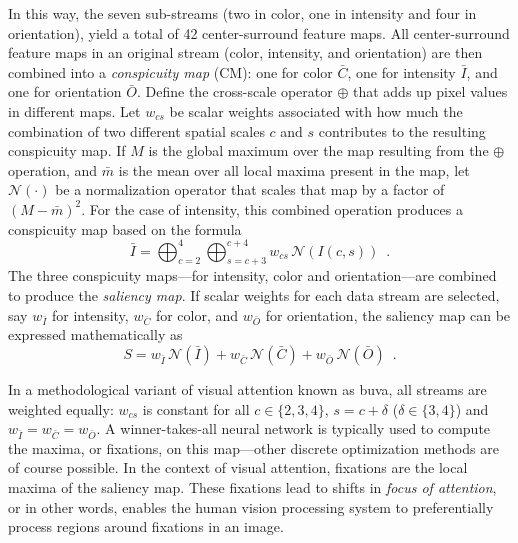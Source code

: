 In this way, the seven sub-streams (two in color, one in intensity and four in orientation), 
yield a total of 42 center-surround feature maps.
All center-surround feature maps in an original stream (color, intensity,
and orientation) are then combined into a \emph{conspicuity map} (CM):
one for color $\bar{C}$, one for intensity $\bar{I}$, and one for orientation $\bar{O}$. 
Define the cross-scale operator $\oplus$ that adds up pixel values in different maps. 
Let $w_{cs}$ be scalar weights associated with how much the combination of
two different spatial scales $c$ and $s$ contributes to the resulting conspicuity map.
If $M$ is the global maximum over the map resulting from the $\oplus$ operation, and $\bar{m}$ is the mean over
all local maxima present in the map, let $\mathcal{N}(\cdot)$ be a normalization operator that scales that map by a factor of $(M-\bar{m})^{2}$.
For the case of intensity, this combined operation produces a conspicuity map based on the formula
%
\begin{equation} \label{eq:feature_map}
 \bar{I}=\bigoplus_{c=2}^{4} \bigoplus_{s=c+3}^{c+4}w_{cs}\,\mathcal{N}(I(c,s))
\enspace.
\end{equation}
%
The three conspicuity maps---for intensity, color and orientation---are combined to produce the \emph{saliency map}.
If scalar weights for each data stream are selected, say
$w_{\bar{I}}$ for intensity, $w_{\bar{C}}$ for color, and 
$w_{\bar{O}}$ for orientation, the saliency map can be expressed mathematically as
%
\begin{equation} \label{eq:saliency_map}
 S=w_{\bar{I}}\,\mathcal{N}(\bar{I})+w_{\bar{C}}\,\mathcal{N}(\bar{C})+
 w_{\bar{O}}\,\mathcal{N}(\bar{O}) \enspace.
\end{equation}
%

In a methodological variant of visual attention known as \gls{buva}, all streams are weighted equally: $w_{cs}$ is constant for all $c\in\{2,3,4\}$,  $s=c+\delta$ ($\delta\in\{3,4\}$)
and $w_{\bar{I}}=w_{\bar{C}}=w_{\bar{O}}$. 
A winner-takes-all neural network is typically used \cite{itti,walther} 
to compute the maxima, or fixations, on this map---other discrete optimization methods are of course possible.
In the context of visual attention, fixations are the local maxima of the saliency map.  
These fixations lead to shifts in \emph{focus of attention}, or in other words, 
enables the human vision processing system to preferentially process regions 
around fixations in an image.

